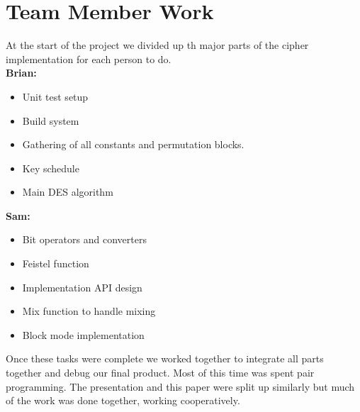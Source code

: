 \documentclass[10pt]{article}
\begin{document}
\section{Team Member Work}

  At the start of the project we divided up th major parts of the cipher implementation for each person to do. \\


  \textbf{Brian:}
  \begin{itemize}
    \item Unit test setup
    \item Build system
    \item Gathering of all constants and permutation blocks.
    \item Key schedule 
    \item Main DES algorithm
  \end{itemize}

  \textbf{Sam:}
  \begin{itemize}
    \item Bit operators and converters
    \item Feistel function
    \item Implementation API design
    \item Mix function to handle mixing
    \item Block mode implementation
  \end{itemize}

  Once these tasks were complete we worked together to integrate all parts together and debug our final product. Most of this
  time was spent pair programming. The presentation and this paper were split up similarly but much of the work was done together, 
  working cooperatively. 


\begin{thebibliography}{99}



\end{thebibliography}
\end{document}
